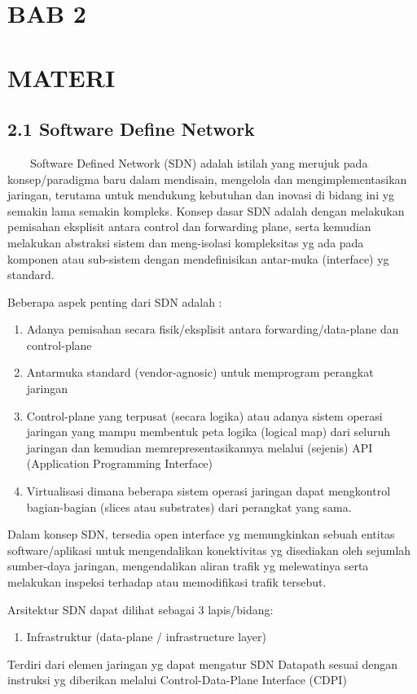 \begin{center}
\section{BAB 2}
\section{MATERI}
\end{center}
\subsection{2.1 Software Define Network}
\ \ \ \ Software Defined Network (SDN) adalah istilah yang merujuk pada konsep/paradigma baru dalam mendisain, mengelola dan
mengimplementasikan jaringan, terutama untuk mendukung kebutuhan dan inovasi di bidang ini yg semakin lama semakin
kompleks. Konsep dasar SDN adalah dengan melakukan pemisahan eksplisit antara control dan forwarding plane, serta
kemudian melakukan abstraksi sistem dan meng-isolasi kompleksitas yg ada pada komponen atau sub-sistem dengan
mendefinisikan antar-muka (interface) yg standard.

Beberapa aspek penting dari SDN adalah :
\liststyleLii
\begin{enumerate}
\item Adanya pemisahan secara fisik/eksplisit antara forwarding/data-plane dan control-plane
\item Antarmuka standard (vendor-agnosic) untuk memprogram perangkat jaringan
\item Control-plane yang terpusat (secara logika) atau adanya sistem operasi jaringan yang mampu membentuk peta logika
(logical map) dari seluruh jaringan dan kemudian memrepresentasikannya melalui (sejenis) API (Application Programming
Interface)
\item Virtualisasi dimana beberapa sistem operasi jaringan dapat mengkontrol bagian-bagian (slices atau substrates) dari
perangkat yang sama.
\end{enumerate}

Dalam konsep SDN, tersedia open interface yg memungkinkan sebuah entitas software/aplikasi untuk mengendalikan
konektivitas yg disediakan oleh sejumlah sumber-daya jaringan, mengendalikan aliran trafik yg melewatinya serta
melakukan inspeksi terhadap atau memodifikasi trafik tersebut.

Arsitektur SDN dapat dilihat sebagai 3 lapis/bidang:
\liststyleLiii
\begin{enumerate}
\item Infrastruktur (data-plane / infrastructure layer)
\end{enumerate}
Terdiri dari elemen jaringan yg dapat mengatur SDN Datapath sesuai dengan instruksi yg diberikan melalui
Control-Data-Plane Interface (CDPI)

